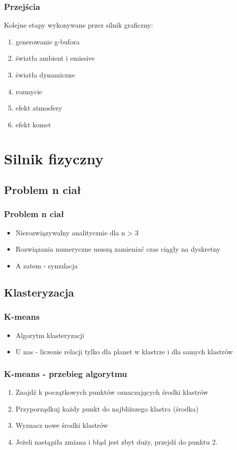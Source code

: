 \documentclass{beamer}
\begin{document}
\frame
{
	\frametitle{Przejścia}

	Kolejne etapy wykonywane przez silnik graficzny:

	\begin{enumerate}
	\item generowanie g-bufora
	\item światła ambient i emissive
	\item światła dynamiczne
	\item rozmycie 
	\item efekt atmosfery
	\item efekt komet
	\end{enumerate}
}

\section{Silnik fizyczny}\label{sec:silnik fizyczny}

\subsection{Problem n ciał}

\frame
{
	\frametitle{Problem n ciał}
	\begin{itemize}
		\item{Nierozwiązywalny analitycznie dla n > 3}
		\item{Rozwiązania numeryczne muszą zamieniać czas ciągły na dyskretny}
		\item{A zatem - symulacja}
	\end{itemize}
}

\subsection{Klasteryzacja}
\frame
{
	\frametitle{K-means}
	\begin{itemize}
	\item{Algorytm klasteryzacji}
	\item{U nas - liczenie relacji tylko dla planet w klastrze i dla samych klastrów}
	\end{itemize}
}

\frame
{
	\frametitle{K-means - przebieg algorytmu}
	\begin{enumerate}
	\item{Znajdź k początkowych punktów oznaczających środki klastrów}
	\item{Przyporządkuj każdy punkt do najbliższego klastra (środka)}
	\item{Wyznacz nowe środki klastrów}
	\item{Jeżeli nastąpiła zmiana i błąd jest zbyt duży, przejdź do punktu 2.}
	\end{enumerate}
}
\end{document}

